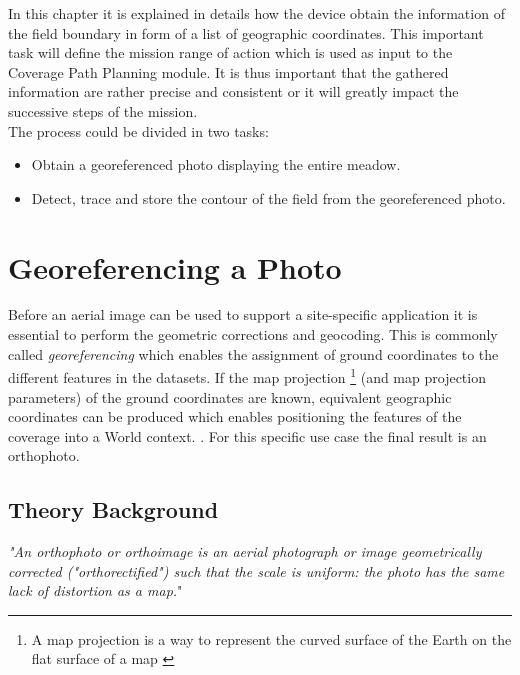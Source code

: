 In this chapter it is explained in details how the device obtain the information of the field boundary in form of a list of geographic coordinates. 
This important task will define the mission range of action which is used as input to the Coverage Path Planning module. It is thus important that the gathered information are rather precise and consistent or it will greatly impact the successive steps of the mission.\\
The process could be divided in two tasks:
\begin{itemize}
	\item Obtain a georeferenced photo displaying the entire meadow.
	\item Detect, trace and store the contour of the field from the georeferenced photo.
\end{itemize}

\section{Georeferencing a Photo} %
\label{sec:georeferenced_photo}
Before an aerial image can be used to support a site-specific application it is essential to perform the geometric corrections and geocoding. This is commonly called \textit{georeferencing} which enables the assignment of ground coordinates to the different features in the datasets. If the map projection \footnote{A map projection is a way to represent the curved surface
of the Earth on the flat surface of a map \cite{PosAccuracyGE}} (and map projection parameters) of the ground coordinates are known, equivalent geographic coordinates can be produced which enables positioning the features of the coverage into a World context. \cite{georefPractice}.
For this specific use case the final result is an orthophoto.

\subsection{Theory Background} %
\label{sub:theory_background}
\textit{"An orthophoto or orthoimage is an aerial photograph or image geometrically corrected ("orthorectified") such that the scale is uniform: the photo has the same lack of distortion as a map.}"\cite{orthophoto&GIS}\\

